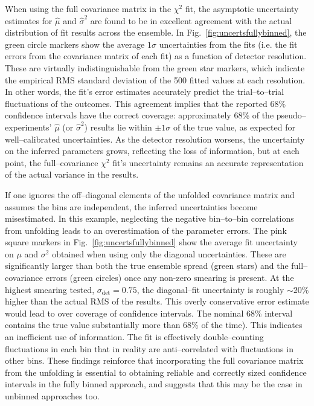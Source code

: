             When using the full covariance matrix in the $\chi^2$ fit, the asymptotic uncertainty estimates for $\hat{\mu}$ and $\hat{\sigma}^2$ are found to be in excellent agreement with the actual distribution of fit results across the ensemble.
            In Fig.~\ref{fig:uncertsfullybinned}, the green circle markers show the average $1\sigma$ uncertainties from the fits (i.e. the fit errors from the covariance matrix of each fit) as a function of detector resolution.
            These are virtually indistinguishable from the green star markers, which indicate the empirical RMS standard deviation of the 500 fitted values at each resolution.
            In other words, the fit’s error estimates accurately predict the trial--to--trial fluctuations of the outcomes.
            This agreement implies that the reported 68\% confidence intervals have the correct coverage:
            approximately 68\% of the pseudo--experiments' $\hat{\mu}$ (or $\hat{\sigma}^2$) results lie within $\pm1\sigma$ of the true value, as expected for well--calibrated uncertainties.
            As the detector resolution worsens, the uncertainty on the inferred parameters grows, reflecting the loss of information, but at each point, the full--covariance \(\chi^2\) fit's uncertainty remains an accurate representation of the actual variance in the results.
    
            If one ignores the off--diagonal elements of the unfolded covariance matrix and assumes the bins are independent, the inferred uncertainties become misestimated.
            In this example, neglecting the negative bin--to--bin correlations from unfolding leads to an overestimation of the parameter errors.
            The pink square markers in Fig.~\ref{fig:uncertsfullybinned} show the average fit uncertainty on $\mu$ and $\sigma^2$ obtained when using only the diagonal uncertainties.
            These are significantly larger than both the true ensemble spread (green stars) and the full--covariance errors (green circles) once any non-zero smearing is present.
            At the highest smearing tested, $\sigma_{\text{det}}=0.75$, the diagonal--fit uncertainty is roughly $\sim20\%$ higher than the actual RMS of the results.
            This overly conservative error estimate would lead to over coverage of confidence intervals.
            The nominal 68\% interval contains the true value substantially more than 68\% of the time).
            This indicates an inefficient use of information.
            The fit is effectively double--counting fluctuations in each bin that in reality are anti--correlated with fluctuations in other bins.
            These findings reinforce that incorporating the full covariance matrix from the unfolding is essential to obtaining reliable and correctly sized confidence intervals in the fully binned approach, and suggests that this may be the case in unbinned approaches too.
    
